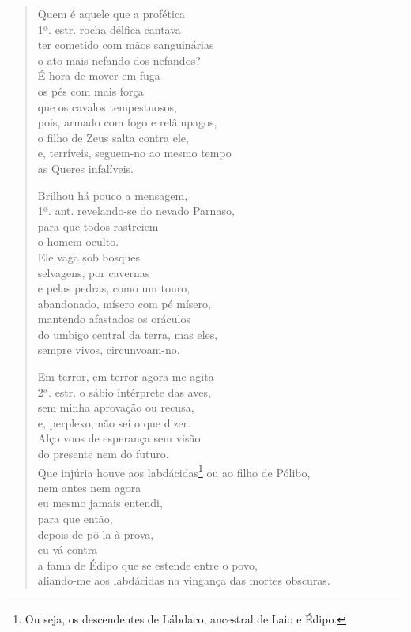 \begin{verse}Quem é aquele que a profética\\ 1ª. estr.
rocha délfica cantava\\
ter cometido com mãos sanguinárias\\
o ato mais nefando dos nefandos?\\
É hora de mover em fuga\\
os pés com mais força\\
que os cavalos tempestuosos,\\
pois, armado com fogo e relâmpagos,\\
o filho de Zeus salta contra ele, \\
e, terríveis, seguem-no ao mesmo tempo\\
as Queres infalíveis.

Brilhou há pouco a mensagem,\\ 1ª. ant.
revelando-se do nevado Parnaso,\\
para que todos rastreiem\\
o homem oculto.\\
Ele vaga sob bosques\\
selvagens, por cavernas\\
e pelas pedras, como um touro,\\
abandonado, mísero com pé mísero,\\
mantendo afastados os oráculos \\
do umbigo central da terra, mas eles,\\
sempre vivos, circunvoam-no.

Em terror, em terror agora me agita\\ 2ª. estr.
o sábio intérprete das aves,\\
sem minha aprovação ou recusa,\\
e, perplexo, não sei o que dizer.\\
Alço voos de esperança sem visão\\
do presente nem do futuro.\\
Que injúria houve aos labdácidas\footnote{Ou seja, os descendentes de Lábdaco, ancestral de Laio e Édipo.}
ou ao filho de Pólibo, \\
nem antes nem agora\\
eu mesmo jamais entendi,\\
para que então,\\
depois de pô-la à prova,\\
eu vá contra\\
a fama de Édipo que se estende entre o povo,\\
aliando-me aos labdácidas na vingança das mortes obscuras.


\end{verse}
